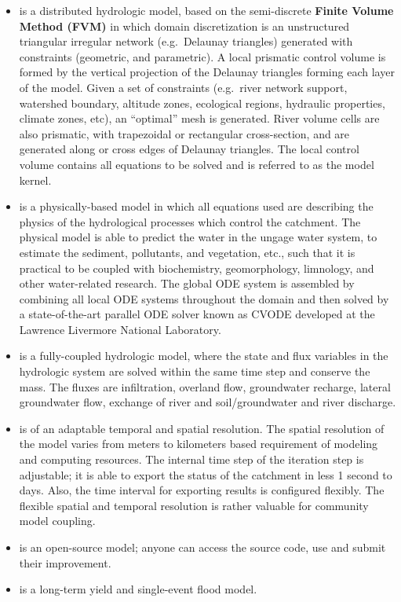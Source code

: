 \documentclass[]{scrbook}
\providecommand{\tightlist}{%
  \setlength{\itemsep}{0pt}\setlength{\parskip}{0pt}}
\begin{document}
\begin{itemize}
\tightlist
\item
  is a distributed hydrologic model, based on the semi-discrete
  \textbf{Finite Volume Method (FVM)} in which domain discretization is
  an unstructured triangular irregular network (e.g.~Delaunay triangles)
  generated with constraints (geometric, and parametric). A local
  prismatic control volume is formed by the vertical projection of the
  Delaunay triangles forming each layer of the model. Given a set of
  constraints (e.g.~river network support, watershed boundary, altitude
  zones, ecological regions, hydraulic properties, climate zones, etc),
  an ``optimal'' mesh is generated. River volume cells are also
  prismatic, with trapezoidal or rectangular cross-section, and are
  generated along or cross edges of Delaunay triangles. The local
  control volume contains all equations to be solved and is referred to
  as the model kernel.
\item
  is a physically-based model in which all equations used are describing
  the physics of the hydrological processes which control the catchment.
  The physical model is able to predict the water in the ungage water
  system, to estimate the sediment, pollutants, and vegetation, etc.,
  such that it is practical to be coupled with biochemistry,
  geomorphology, limnology, and other water-related research. The global
  ODE system is assembled by combining all local ODE systems throughout
  the domain and then solved by a state-of-the-art parallel ODE solver
  known as CVODE developed at the Lawrence Livermore National
  Laboratory.
\item
  is a fully-coupled hydrologic model, where the state and flux
  variables in the hydrologic system are solved within the same time
  step and conserve the mass. The fluxes are infiltration, overland
  flow, groundwater recharge, lateral groundwater flow, exchange of
  river and soil/groundwater and river discharge.
\item
  is of an adaptable temporal and spatial resolution. The spatial
  resolution of the model varies from meters to kilometers based
  requirement of modeling and computing resources. The internal time
  step of the iteration step is adjustable; it is able to export the
  status of the catchment in less 1 second to days. Also, the time
  interval for exporting results is configured flexibly. The flexible
  spatial and temporal resolution is rather valuable for community model
  coupling.
\item
  is an open-source model; anyone can access the source code, use and
  submit their improvement.
\item
  is a long-term yield and single-event flood model.
\end{itemize}
\end{document}
